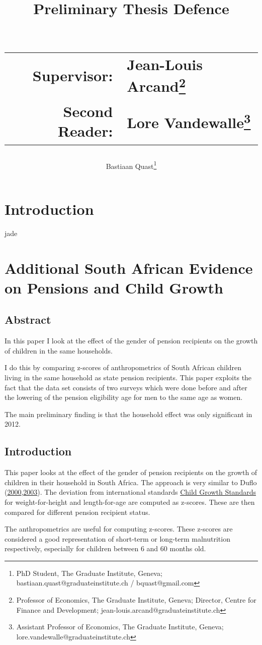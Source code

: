 \documentclass[a4paper]{book}\usepackage{graphicx, color}
\title{Preliminary Thesis Defence\\~\\
\begin{tabular}{rl}
Supervisor:&Jean-Louis Arcand\footnote{Professor of Economics, The Graduate Institute, Geneva; Director, Centre for Finance and Development; jean-louis.arcand@graduateinstitute.ch}\\
Second Reader:&Lore Vandewalle\footnote{Assistant Professor of Economics, The Graduate Institute, Geneva; lore.vandewalle@graduateinstitute.ch}
\end{tabular}
}
\author{Bastiaan Quast\thanks{PhD Student, The Graduate Institute, Geneva; bastiaan.quast@graduateinstitute.ch / bquast@gmail.com}}
\begin{document}
\frontmatter
\maketitle
\tableofcontents

\chapter{Introduction}
jade

\mainmatter

\chapter{Additional South African Evidence on Pensions and Child Growth}

\section*{Abstract}

In this paper I look at the effect of the gender of pension recipients
on the growth of children in the same households.

I do this by comparing z-scores of anthropometrics of South African
children living in the same household as state pension recipients. This
paper exploits the fact that the data set consists of two surveys which
were done before and after the lowering of the pension eligibility age
for men to the same age as women.

The main preliminary finding is that the household effect was only
significant in 2012.

\section{Introduction}

This paper looks at the effect of the gender of pension recipients on
the growth of children in their household in South Africa. The approach
is very similar to Duflo
(\href{http://www.jstor.org/discover/10.2307/117257}{2000},\href{http://wber.oxfordjournals.org/content/17/1/1}{2003}).
The deviation from international standards
\href{http://www.who.int/childgrowth/en/}{Child Growth Standards} for
weight-for-height and length-for-age are computed as z-scores. These are
then compared for different pension recipient status.

The anthropometrics are useful for computing z-scores. These z-scores
are considered a good representation of short-term or long-term
malnutrition respectively, especially for children between 6 and 60
months old.
\end{document}

